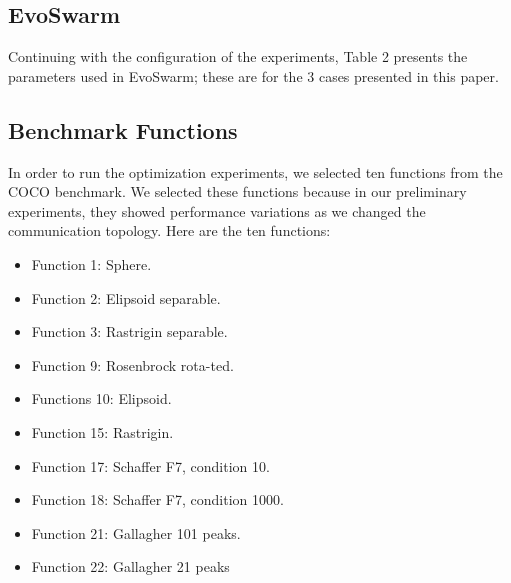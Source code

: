 \documentclass[runningheads]{llncs}
\begin{document}
\subsection{EvoSwarm}
Continuing with the configuration of the experiments, Table 2 presents the parameters used in EvoSwarm; these are for the 3 cases presented in this paper. 

\begin{table}[h]
\centering
\caption{Parameters for EvoSwarm}
\label{table:1}
\end{table}

\subsection{Benchmark Functions}
In order to run the optimization experiments, we selected ten functions from the COCO benchmark. We selected these functions because in our preliminary experiments, they showed performance variations as we changed the communication topology. Here are the ten functions:
\begin{multicols}{2}
\begin{itemize}

    \item Function 1: Sphere.
    \item Function 2: Elipsoid separable.
    \item Function 3: Rastrigin separable.
    \item Function 9: Rosenbrock rota-ted.
    \item Functions 10: Elipsoid.
    \item Function 15: Rastrigin.
    \item Function 17: Schaffer F7, condition 10.
    \item Function 18: Schaffer F7, condition 1000.
    \item Function 21: Gallagher 101 peaks.
    \item Function 22: Gallagher 21 peaks

\end{itemize}
\end{multicols}
\end{document}
